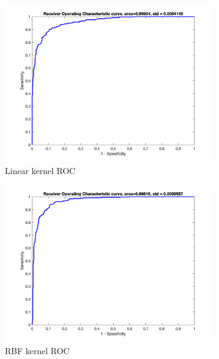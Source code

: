\documentclass[a4paper, 11pt, one column]{article}
\begin{document}
\begin{figure}[hbt]
\begin{subfigure}{0.45\linewidth}
            \includegraphics[width=\linewidth]{images/ripley_linearkernel_ROC.png}
            \caption{Linear kernel ROC}
        \end{subfigure}
        \begin{subfigure}{0.45\linewidth}
            \includegraphics[width=\linewidth]{images/ripley_ROC_RBF.png}
            \caption{RBF kernel ROC}
        \end{subfigure}
        \centering
	   \begin{subfigure}{0.45\linewidth}

\end{subfigure}
\end{figure}
\end{document}
